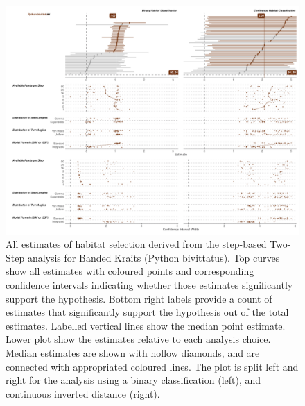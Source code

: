\documentclass[10pt,a4paper]{article}
\begin{document}
\begin{figure}
\includegraphics[width=1\linewidth]{../../figures/specCurve_Python bivittatus_twoStep} \caption{All estimates of habitat selection derived from the step-based Two-Step analysis for Banded Kraits (Python bivittatus). Top curves show all estimates with coloured points and corresponding confidence intervals indicating whether those estimates significantly support the hypothesis. Bottom right labels provide a count of estimates that significantly support the hypothesis out of the total estimates. Labelled vertical lines show the median point estimate. Lower plot show the estimates relative to each analysis choice. Median estimates are shown with hollow diamonds, and are connected with appropriated coloured lines. The plot is split left and right for the analysis using a binary classification (left), and continuous inverted distance (right).}\label{fig:specCurveTwoStepPYBI}
\end{figure}
\end{document}
